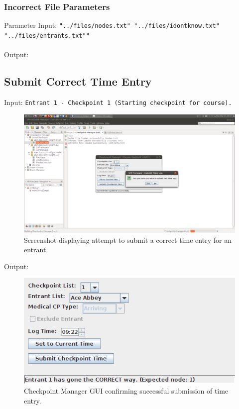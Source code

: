 \documentclass[a4paper, 10pt]{article}
\begin{document}
\clearpage
\subsubsection{Incorrect File Parameters}

Parameter Input: \verb+"../files/nodes.txt" "../files/idontknow.txt" "../files/entrants.txt""+ \\\\
Output:


\subsection{Submit Correct Time Entry}

Input: \verb+Entrant 1 - Checkpoint 1 (Starting checkpoint for course).+ \\
\begin{figure}[ht!]
\centering
\includegraphics[scale=0.25]{cm-submit.png}
\caption{Screenshot displaying attempt to submit a correct time entry for an entrant.}
\end{figure}

Output:
\begin{figure}[ht!]
\centering
\includegraphics[scale=0.5]{cm-submitsuccess.png}
\caption{Checkpoint Manager GUI confirming successful submission of time entry.}
\end{figure}
\end{document}
